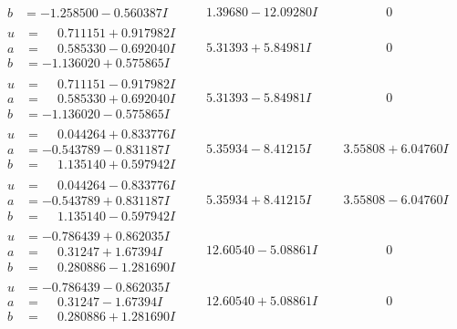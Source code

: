 \documentclass[1p]{elsarticle_modified}
\theoremstyle{definition}
\begin{document}
$$\begin{array}{c|c|c}
\begin{aligned}
b &= -1.258500 - 0.560387 I\end{aligned}
 & \phantom{-}1.39680 - 12.09280 I & \phantom{-0.000000 } 0 \\ \hline\begin{aligned}
u &= \phantom{-}0.711151 + 0.917982 I \\
a &= \phantom{-}0.585330 - 0.692040 I \\
b &= -1.136020 + 0.575865 I\end{aligned}
 & \phantom{-}5.31393 + 5.84981 I & \phantom{-0.000000 } 0 \\ \hline\begin{aligned}
u &= \phantom{-}0.711151 - 0.917982 I \\
a &= \phantom{-}0.585330 + 0.692040 I \\
b &= -1.136020 - 0.575865 I\end{aligned}
 & \phantom{-}5.31393 - 5.84981 I & \phantom{-0.000000 } 0 \\ \hline\begin{aligned}
u &= \phantom{-}0.044264 + 0.833776 I \\
a &= -0.543789 - 0.831187 I \\
b &= \phantom{-}1.135140 + 0.597942 I\end{aligned}
 & \phantom{-}5.35934 - 8.41215 I & \phantom{-}3.55808 + 6.04760 I \\ \hline\begin{aligned}
u &= \phantom{-}0.044264 - 0.833776 I \\
a &= -0.543789 + 0.831187 I \\
b &= \phantom{-}1.135140 - 0.597942 I\end{aligned}
 & \phantom{-}5.35934 + 8.41215 I & \phantom{-}3.55808 - 6.04760 I \\ \hline\begin{aligned}
u &= -0.786439 + 0.862035 I \\
a &= \phantom{-}0.31247 + 1.67394 I \\
b &= \phantom{-}0.280886 - 1.281690 I\end{aligned}
 & \phantom{-}12.60540 - 5.08861 I & \phantom{-0.000000 } 0 \\ \hline\begin{aligned}
u &= -0.786439 - 0.862035 I \\
a &= \phantom{-}0.31247 - 1.67394 I \\
b &= \phantom{-}0.280886 + 1.281690 I\end{aligned}
 & \phantom{-}12.60540 + 5.08861 I & \phantom{-0.000000 } 0 \\ \hline\begin{aligned}

\end{aligned}
\end{array}$$
\end{document}
